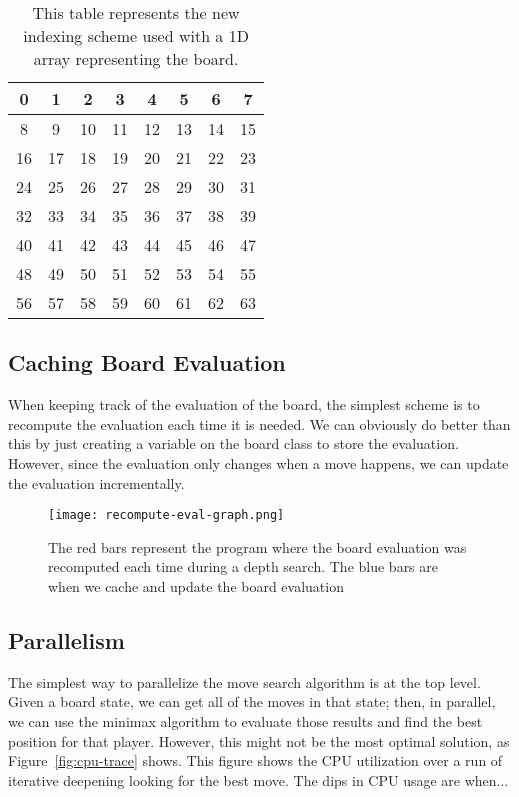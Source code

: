 \documentclass[sigconf]{acmart}
\begin{document}
\begin{table}[H]
    \renewcommand{\arraystretch}{1.5}
    \setlength{\arrayrulewidth}{1pt}
    \setlength{\tabcolsep}{5pt}
    \begin{tabular}{|c|c|c|c|c|c|c|c|}
        \hline
        0  & 1  & 2  & 3  & 4  & 5  & 6  & 7  \\
        \hline
        8  & 9  & 10  & 11  & 12  & 13  & 14  & 15  \\
        \hline
        16  & 17  & 18  & 19  & 20  & 21  & 22  & 23  \\
        \hline
        24  & 25  & 26  & 27  & 28  & 29  & 30  & 31  \\
        \hline
        32  & 33  & 34  & 35  & 36  & 37  & 38  & 39  \\
        \hline
        40  & 41  & 42  & 43  & 44  & 45  & 46  & 47  \\
        \hline
        48  & 49  & 50  & 51  & 52  & 53  & 54  & 55  \\
        \hline
        56  & 57  & 58  & 59  & 60  & 61  & 62  & 63  \\
        \hline
    \end{tabular}
    \caption{This table represents the new indexing scheme used with a 1D array representing the board.}
    \label{tab:example_table}
\end{table}

\subsection{Caching Board Evaluation}
When keeping track of the evaluation of the board, the simplest scheme is to recompute the evaluation each time it is needed.
We can obviously do better than this by just creating a variable on the board class to store the evaluation.
However, since the evaluation only changes when a move happens, we can update the evaluation incrementally.

\begin{figure}[H]
    \centering
    \texttt{[image: recompute-eval-graph.png]}
    \caption{The red bars represent the program where the board evaluation was recomputed each time during a depth search. The blue bars are when we cache and update the board evaluation}
    \label{fig:eval-speedup}
\end{figure}

\subsection{Parallelism}
The simplest way to parallelize the move search algorithm is at the top level. Given a board state, we can get all of the moves in that state; then, in parallel, we can use the minimax algorithm to evaluate those results and find the best position for that player.
However, this might not be the most optimal solution, as Figure~\ref{fig:cpu-trace} shows.
This figure shows the CPU utilization over a run of iterative deepening looking for the best move.
The dips in CPU usage are when...
\end{document}
